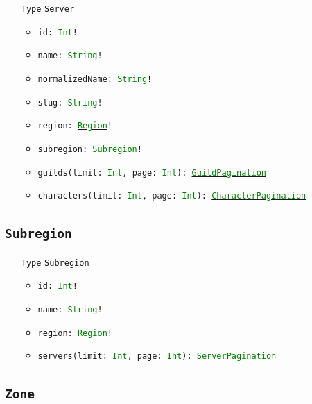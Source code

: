 \documentclass[10pt, a4paper]{memoir}
\numberwithin{equation}{section}
\theoremstyle{plain}
\theoremstyle{defp}
\theoremstyle{dotless}
\theoremstyle{definition}
\theoremstyle{dotless}
\theoremstyle{dotless}
\theoremstyle{defp}
\theoremstyle{defp}
\theoremstyle{be}          %
\theoremstyle{defp}
\newcommand\ttt[1]{\texttt{#1}}
\newcommand\type[1]{\ttt{\textcolor{green}{#1}}}
\begin{document}
\begin{itemize}[noitemsep,topsep=1pt]
\item[\ttt{Type}] \ttt{Server}
\begin{itemize}[itemsep=1pt,topsep=1pt]
\item \ttt{id: \type{Int}!}
\item \ttt{name: \type{String}!}
\item \ttt{normalizedName: \type{String}!}
\item \ttt{slug: \type{String}!}
\item \ttt{region: \hyperref[sec:Region]{\type{Region}}!}
\item \ttt{subregion: \hyperref[sec:Subregion]{\type{Subregion}}!}
\item \ttt{guilds(limit: \type{Int}, page: \type{Int}): \hyperref[sec:guildpagination]{\type{GuildPagination}}}
\item \ttt{characters(limit: \type{Int}, page: \type{Int}): \hyperref[sec:characterpagination]{\type{CharacterPagination}}}
\end{itemize}
\end{itemize}

\subsection{\ttt{Subregion}}\label{sec:Subregion}

\begin{itemize}[noitemsep,topsep=1pt]
\item[\ttt{Type}] \ttt{Subregion}
\begin{itemize}[itemsep=1pt,topsep=1pt]
\item \ttt{id: \type{Int}!}
\item \ttt{name: \type{String}!}
\item \ttt{region: \type{Region}!}
\item \ttt{servers(limit: \type{Int}, page: \type{Int}): \hyperref[sec:serverpagination]{\type{ServerPagination}}}
\end{itemize}
\end{itemize}


\subsection{\ttt{Zone}}\label{sec:Zone}
\end{document}
